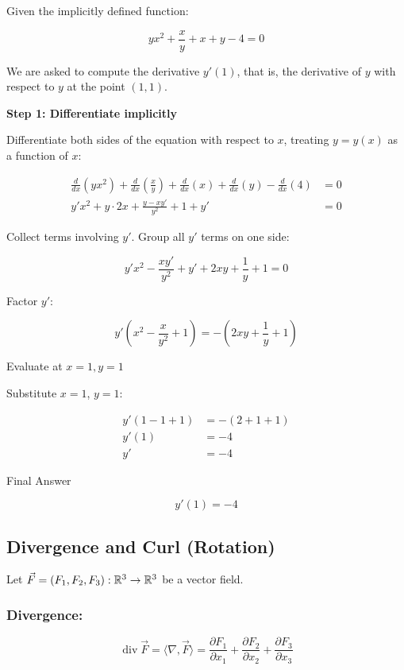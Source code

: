 Given the implicitly defined function:

\[
    y x^2 + \frac{x}{y} + x + y - 4 = 0
\]

We are asked to compute the derivative \( y'(1) \), that is, the derivative of \(y\) 
with respect to \(y\) at the point \( (1, 1) \).

\textbf{Step 1: Differentiate implicitly}

Differentiate both sides of the equation with respect to \(x\), 
treating \( y = y(x) \) as a function of \(x\):

\begin{align*}
    \frac{d}{dx}(y x^2) + \frac{d}{dx}\left(\frac{x}{y}\right) + \frac{d}{dx}(x) + \frac{d}{dx}(y) - \frac{d}{dx}(4) &= 0 \\
    y' x^2 + y \cdot 2x + \frac{y - x y'}{y^2} + 1 + y' &= 0
\end{align*}

Collect terms involving \( y' \). Group all \( y' \) terms on one side:

\[
    y' x^2 - \frac{x y'}{y^2} + y' + 2xy + \frac{1}{y} + 1 = 0
\]

Factor \( y' \):

\[
    y' \left(x^2 - \frac{x}{y^2} + 1\right) = -\left(2xy + \frac{1}{y} + 1\right)
\]

Evaluate at \( x = 1, y = 1 \)

Substitute \( x = 1 \), \( y = 1 \):

\begin{align*}
    y' (1 - 1 + 1) &= - (2 + 1 + 1) \\
    y' (1) &= -4 \\
    y' &= -4
\end{align*}

Final Answer

\[
    y'(1) = -4
\]

\subsection{Divergence and Curl (Rotation)}

Let \( \vec{F} = (F_1, F_2, F_3) : \mathbb{R}^3 \to \mathbb{R}^3 \) be a vector field.

\subsubsection{Divergence:}

\[
    \operatorname{div} \vec{F} = \langle\nabla, \vec{F}\rangle = \frac{\partial F_1}{\partial x_1} + 
    \frac{\partial F_2}{\partial x_2} + \frac{\partial F_3}{\partial x_3}
\]

